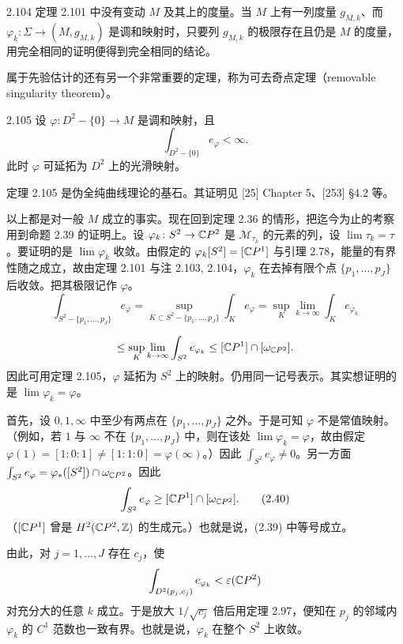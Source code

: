 \begin{remark}{2.104}
  定理 2.101 中没有变动 $M$ 及其上的度量。当 $M$ 上有一列度量 $g_{M,k}$、而 $\varphi_k\colon\Sigma\to(M,g_{M,k})$ 是调和映射时，只要列 $g_{M,k}$ 的极限存在且仍是 $M$ 的度量，用完全相同的证明便得到完全相同的结论。
\end{remark}

属于先验估计的还有另一个非常重要的定理，称为可去奇点定理（removable singularity theorem）。

\begin{theorem}{2.105}
  设 $\varphi\colon D^2-\{0\}\to M$ 是调和映射，且
  \[
    \int_{D^2-\{0\}}e_\varphi<\infty .
  \]
  此时 $\varphi$ 可延拓为 $D^2$ 上的光滑映射。
\end{theorem}

定理 2.105 是伪全纯曲线理论的基石。其证明见 [25] Chapter 5、[253] §4.2 等。

以上都是对一般 $M$ 成立的事实。现在回到定理 2.36 的情形，把迄今为止的考察用到命题 2.39 的证明上。设 $\varphi_k\colon S^2\to\mathbb{C} P^2$ 是 $\mathcal{M}_{\tau_k}$ 的元素的列，设 $\lim\tau_k=\tau$。要证明的是 $\lim\varphi_k$ 收敛。由假定的 $\varphi_k[S^2]=[\mathbb{C} P^1]$ 与引理 2.78，能量的有界性随之成立，故由定理 2.101 与注 2.103, 2.104，$\varphi_k$ 在去掉有限个点 $\{p_1,\dots,p_J\}$ 后收敛。把其极限记作 $\varphi$。
\begin{equation}
  \int_{S^2-\{p_1,\dots,p_J\}}e_\varphi
  =\sup_{K\subset S^2-\{p_1,\dots,p_J\}}\int_Ke_\varphi
  =\sup_K\lim_{k\to\infty}\int_Ke_{\varphi_k} \tag{2.39}
\end{equation}

\[
  \le\sup_K\lim_{k\to\infty}\int_{S^2}e_{\varphi_k}
  \le[\mathbb{C} P^1]\cap[\omega_{\mathbb{C} P^2}].
\]
因此可用定理 2.105，$\varphi$ 延拓为 $S^2$ 上的映射。仍用同一记号表示。其实想证明的是 $\lim\varphi_k=\varphi$。

首先，设 $0,1,\infty$ 中至少有两点在 $\{p_1,\dots,p_J\}$ 之外。于是可知 $\varphi$ 不是常值映射。（例如，若 $1$ 与 $\infty$ 不在 $\{p_1,\dots,p_J\}$ 中，则在该处 $\lim\varphi_k=\varphi$，故由假定 $\varphi(1)=[1:0:1]\ne[1:1:0]=\varphi(\infty)$。）因此 $\int_{S^2}e_\varphi\ne0$。另一方面 $\int_{S^2}e_\varphi=\varphi_*([S^2])\cap\omega_{\mathbb{C} P^2}$。因此
\begin{equation}
  \int_{S^2}e_\varphi\ge[\mathbb{C} P^1]\cap[\omega_{\mathbb{C} P^2}]. \tag{2.40}
\end{equation}
（$[\mathbb{C} P^1]$ 曾是 $H^2(\mathbb{C} P^2,\mathbb{Z})$ 的生成元。）也就是说，(2.39) 中等号成立。

由此，对 $j=1,\dots,J$ 存在 $c_j$，使
\[
  \int_{D^2(p_j,c_j)}e_{\varphi_k}<\varepsilon(\mathbb{C} P^2)
\]
对充分大的任意 $k$ 成立。于是放大 $1/\sqrt{c_j}$ 倍后用定理 2.97，便知在 $p_j$ 的邻域内 $\varphi_k$ 的 $C^1$ 范数也一致有界。也就是说，$\varphi_k$ 在整个 $S^2$ 上收敛。

